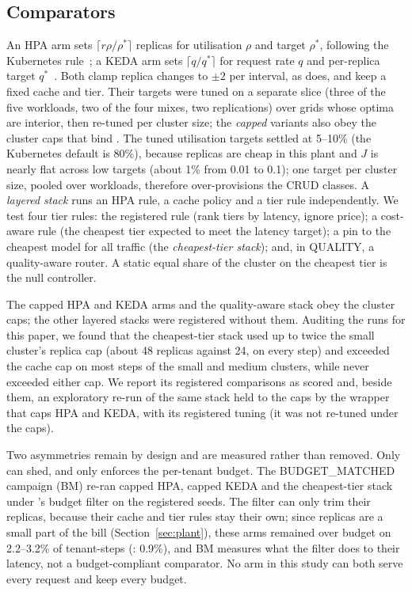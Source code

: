 \subsection{Comparators}
\label{sec:comparators}

An HPA arm sets $\lceil r\rho/\rho^\ast\rceil$ replicas for utilisation
$\rho$ and target $\rho^\ast$, following the Kubernetes rule~\cite{k8shpa};
a KEDA arm sets $\lceil q/q^\ast\rceil$ for request rate $q$ and
per-replica target $q^\ast$~\cite{keda}. Both clamp replica changes to
$\pm2$ per interval, as \jcac{} does, and keep a fixed cache and tier. Their
targets were tuned on a separate slice (three of the five workloads, two
of the four mixes, two replications) over grids whose optima are interior,
then re-tuned per cluster size; the \emph{capped} variants also obey the
cluster caps that bind \jcac{}. The tuned utilisation targets settled at
5--10\% (the Kubernetes default is 80\%), because replicas are cheap in
this plant and $J$ is nearly flat across low targets (about 1\% from 0.01
to 0.1); one target per cluster size, pooled over workloads, therefore
over-provisions the CRUD classes. A \emph{layered stack} runs an HPA rule, a
cache policy and a tier rule independently. We test four tier rules: the
registered rule (rank tiers by latency, ignore price); a cost-aware rule
(the cheapest tier expected to meet the latency target); a pin to the
cheapest model for all traffic (the \emph{cheapest-tier stack}); and, in QUALITY, a quality-aware router. A static equal share of
the cluster on the cheapest tier is the null controller.

The capped HPA and KEDA arms and the quality-aware stack obey the cluster
caps; the other layered stacks were registered without them. Auditing the
runs for this paper, we found that the cheapest-tier stack used up to twice
the small cluster's replica cap (about 48 replicas against 24, on every
step) and exceeded the cache cap on most steps of the small and medium
clusters, while \jcac{} never exceeded either cap. We report its registered
comparisons as scored and, beside them, an exploratory re-run of the same
stack held to the caps by the wrapper that caps HPA and KEDA, with its
registered tuning (it was not re-tuned under the caps).

Two asymmetries remain by design and are measured rather than removed.
Only \jcac{} can shed, and only \jcac{} enforces the per-tenant budget. The
BUDGET\_MATCHED campaign (BM) re-ran capped HPA, capped KEDA and the
cheapest-tier stack under \jcac{}'s budget filter on the registered seeds.
The filter can only trim their replicas, because their cache and tier rules
stay their own; since replicas are a small part of the bill
(Section~\ref{sec:plant}), these arms remained over budget on 2.2--3.2\%
of tenant-steps (\jcac{}: 0.9\%), and BM measures what the filter does to
their latency, not a budget-compliant comparator. No arm in this study can
both serve every request and keep every budget.

